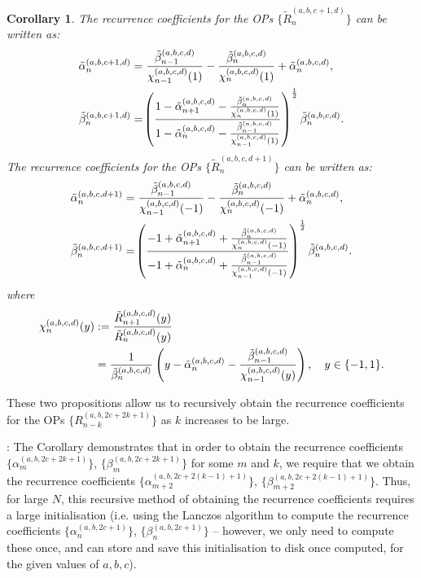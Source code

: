 \documentclass[11pt, oneside]{article}   	%
\newcommand{\half}{\frac{1}{2}}
\newcommand{\genjac}{R}
\newcommand{\genjact}{\tilde{\genjac}}
\newtheorem{corollary}{Corollary}
\begin{document}
\begin{corollary}
The recurrence coefficients for the OPs $\{\genjact_n^{(a,b,c+1,d)}\}$ can be written as:
\begin{align}
	\tilde{\alpha}_n^{(a,b,c+1,d)} &= \frac{\tilde{\beta}_{n-1}^{(a,b,c,d)}}{\chi_{n-1}^{(a,b,c,d)}(1)} - \frac{\tilde{\beta}_{n}^{(a,b,c,d)}}{\chi_{n}^{(a,b,c,d)}(1)} + \tilde{\alpha}_{n}^{(a,b,c,d)}, \\
	\tilde{\beta}_n^{(a,b,c+1,d)} &= \fpr(\frac{1 - \tilde{\alpha}_{n+1}^{(a,b,c,d)} - \frac{\tilde{\beta}_n^{(a,b,c,d)}}{\chi_n^{(a,b,c,d)}(1)}}{1 - \tilde{\alpha}_{n}^{(a,b,c,d)} - \frac{\tilde{\beta}_{n-1}^{(a,b,c,d)}}{\chi_{n-1}^{(a,b,c,d)}(1)}})^\half \tilde{\beta}_n^{(a,b,c,d)}.
\end{align}
The recurrence coefficients for the OPs $\{\genjact_n^{(a,b,c,d+1)}\}$ can be written as:
\begin{align}
	\tilde{\alpha}_n^{(a,b,c,d+1)} &= \frac{\tilde{\beta}_{n-1}^{(a,b,c,d)}}{\chi_{n-1}^{(a,b,c,d)}(-1)} - \frac{\tilde{\beta}_{n}^{(a,b,c,d)}}{\chi_{n}^{(a,b,c,d)}(-1)} + \tilde{\alpha}_{n}^{(a,b,c,d)}, \\
	\tilde{\beta}_n^{(a,b,c,d+1)} &= \fpr(\frac{- 1 + \tilde{\alpha}_{n+1}^{(a,b,c,d)} + \frac{\tilde{\beta}_n^{(a,b,c,d)}}{\chi_n^{(a,b,c,d)}(-1)}}{- 1 + \tilde{\alpha}_{n}^{(a,b,c,d)} + \frac{\tilde{\beta}_{n-1}^{(a,b,c,d)}}{\chi_{n-1}^{(a,b,c,d)}(-1)}})^\half \tilde{\beta}_n^{(a,b,c,d)}.
\end{align}
where 
\begin{align}
	\chi_{n}^{(a,b,c,d)}(y) &:= \frac{\genjact_{n+1}^{(a,b,c,d)}(y)}{\genjact_{n}^{(a,b,c,d)}(y)} \\
	&= \frac{1}{\tilde{\beta}_{n}^{(a,b,c,d)}} \: \fpr(y - \tilde{\alpha}_{n}^{(a,b,c,d)} - \frac{\tilde{\beta}_{n-1}^{(a,b,c,d)}}{\chi_{n-1}^{(a,b,c,d)}(y)}), \quad y \in \{-1,1\}.
\end{align}
\end{corollary}

These two propositions allow us to recursively obtain the recurrence coefficients for the OPs $\{\genjac_{n-k}^{(a,b,2c+2k + 1)}\}$ as $k$ increases to be large. 

:
The Corollary demonstrates that in order to obtain the recurrence coefficients $\{\alpha_{m}^{(a,b,2c+2k+1)}\}$, $\{\beta_{m}^{(a,b,2c+2k+1)}\}$ for some $m$ and $k$, we require that we obtain the recurrence coefficients $\{\alpha_{m+2}^{(a,b,2c+2(k-1)+1)}\}$, $\{\beta_{m+2}^{(a,b,2c+2(k-1)+1)}\}$. Thus, for large $N$, this recursive method of obtaining the recurrence coefficients requires a large initialisation (i.e. using the Lanczos algorithm to compute the recurrence coefficients $\{\alpha_{n}^{(a,b,2c+1)}\}$, $\{\beta_{n}^{(a,b,2c+1)}\}$ -- however, we only need to compute these once, and can store and save this initialisation to disk once computed, for the given values of $a, b, c$). 
\end{document}
